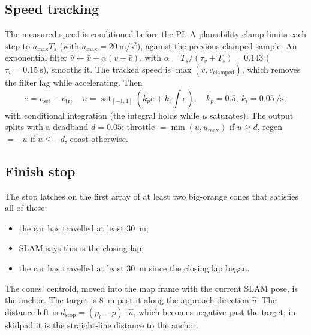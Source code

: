 \documentclass[11pt,a4paper]{article}
\newcommand{\sat}{\operatorname{sat}}
\begin{document}
\subsection{Speed tracking}
The measured speed is conditioned before the PI. A plausibility clamp limits each step to
$a_{\max} T_s$ (with $a_{\max} = \SI{20}{\metre\per\second\squared}$), against the
previous clamped sample. An exponential filter
$\hat v \leftarrow \hat v + \alpha (v - \hat v)$, with
$\alpha = T_s / (\tau_v + T_s) = 0.143$ ($\tau_v = \SI{0.15}{\second}$), smooths it. The
tracked speed is $\max(\hat v, v_{\text{clamped}})$, which removes the filter lag while
accelerating. Then
\begin{equation}
e = v_{\text{set}} - v_{\text{tr}}, \quad
u = \sat_{[-1,1]}\!\left(k_p e + k_i \textstyle\int e\right), \quad
k_p = 0.5,\ k_i = \SI{0.05}{\per\second},
\end{equation}
with conditional integration (the integral holds while $u$ saturates). The output splits
with a deadband $d = 0.05$: throttle $= \min(u, u_{\max})$ if $u \ge d$, regen $= -u$ if
$u \le -d$, coast otherwise.

\subsection{Finish stop}
The stop latches on the first array of at least two big-orange cones that satisfies all
of these:
\begin{itemize}
\item the car has travelled at least \SI{30}{\metre};
\item SLAM says this is the closing lap;
\item the car has travelled at least \SI{30}{\metre} since the closing lap began.
\end{itemize}
The cones' centroid, moved into the map frame with the current SLAM pose, is the anchor.
The target is \SI{8}{\metre} past it along the approach direction $\hat u$. The distance
left is $d_{\text{stop}} = (p_t - p)\cdot\hat u$, which becomes negative past the target;
in skidpad it is the straight-line distance to the anchor.

\end{document}
